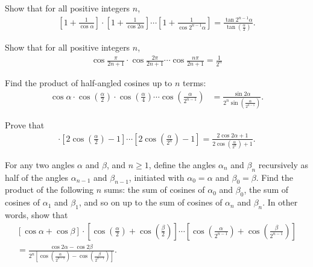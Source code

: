 \documentclass[12pt,a4paper]{memoir}
\theoremstyle{definition}
\begin{document}
\begin{question}
	Show that for all positive integers $n$,
	\begin{align*}
		\left[1+\frac{1}{\cos \alpha}\right]\cdot \left[1+\frac{1}{\cos 2\alpha}\right] \cdots \left[1+\frac{1}{\cos 2^{n-1}\alpha}\right] = \frac{\tan 2^{n-1}\alpha}{\displaystyle \tan\left(\frac{\alpha}{2}\right)}.
	\end{align*}
\end{question}


\begin{question}
	Show that for all positive integers $n$,
	\begin{align*}
		\cos\frac{\pi}{2n+1} \cdot \cos\frac{2\pi}{2n+1} \cdots \cos\frac{n\pi}{2n+1} = \frac{1}{2^n}
	\end{align*}
\end{question}

\begin{question}
	Find the product of half-angled cosines up to $n$ terms:
	\begin{align*}
		\cos \alpha \cdot \cos\left(\frac{\alpha}{2}\right) \cdot \cos\left(\frac{\alpha}{4}\right) \cdots \cos\left(\frac{\alpha}{2^{n-1}}\right) &= \frac{\sin 2\alpha}{2^n\sin\left(\frac{\alpha}{2^{n-1}}\right)}.
	\end{align*}
\end{question}

\begin{question}
	Prove that
	\begin{align*}
		[2\cos(\alpha) -1 ]\cdot \left[2\cos\left(\frac{\alpha}{2}\right)-1\right] \cdots \left[2\cos\left(\frac{\alpha}{2^n}\right)-1\right] = \frac{2\cos 2\alpha+1}{\displaystyle 2\cos\left(\frac{\alpha}{2^n}\right) + 1}.
	\end{align*}
\end{question}


\begin{question}
	For any two angles $\alpha$ and $\beta$, and $n\geq 1$, define the angles $\alpha_n$ and $\beta_n$ recursively as half of the angles $\alpha_{n-1}$ and $\beta_{n-1}$, initiated with $\alpha_0=\alpha$ and $\beta_0=\beta$. Find the product of the following $n$ sums: the sum of cosines of $\alpha_0$ and $\beta_0$, the sum of cosines of $\alpha_1$ and $\beta_1$, and so on up to the sum of cosines of $\alpha_{n}$ and $\beta_n$. In other words, show that
	\begin{multline*}
		\left[\cos \alpha + \cos \beta\right]\cdot \left[\cos\left(\frac{\alpha}{2}\right)+\cos\left(\frac{\beta}{2}\right)\right]
		\cdots
		\left[\cos\left(\frac{\alpha}{2^{n-1}}\right)+\cos\left(\frac{\beta}{2^{n-1}}\right)\right]
		\\= \frac{\cos 2\alpha - \cos 2\beta}{\displaystyle 2^n\left[\cos\left(\frac{\alpha}{2^{n-1}}\right)-\cos\left(\frac{\beta}{2^{n-1}}\right)\right]}.
	\end{multline*}
\end{question}
\end{document}
